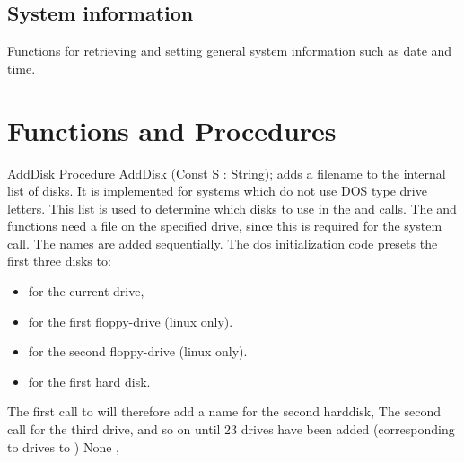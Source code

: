\subsection{System information}
Functions for retrieving and setting general system information such as date
and time.
\begin{funclist}
\end{funclist}

\section{Functions and Procedures}
\begin{procedure}{AddDisk}
\Declaration
Procedure AddDisk (Const S : String);
\Description
{} adds a filename  to the internal list of disks. It is
implemented for systems which do not use DOS type drive letters.
 This list is used to determine which disks to use in the 
and  calls. 
The  and  functions need a file on the 
specified drive, since this is required for the  system call.
The names are added sequentially. The dos
initialization code presets the first three disks to:
\begin{itemize}
\item {} for the current drive, 
\item {} for the first floppy-drive (linux only).
\item {} for the second floppy-drive (linux only).
\item {} for the first hard disk.
\end{itemize}
The first call to  will therefore add a name for the second
harddisk, The second call for the third drive, and so on until 23 drives
have been added (corresponding to drives  to )
\Errors
None
\SeeAlso
{},  
\end{procedure}


